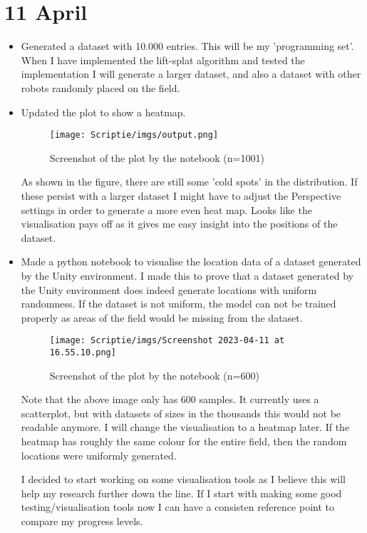 \documentclass[twoside]{report}
\begin{document}
\section*{11 April}
\begin{itemize}
\item Generated a dataset with 10.000 entries. This will be my 'programming set'. When I have implemented the lift-splat algorithm and tested the implementation I will generate a larger dataset, and also a dataset with other robots randomly placed on the field.
\item Updated the plot to show a heatmap.
        \begin{figure}[!h]
        \begin{centering}
        \texttt{[image: Scriptie/imgs/output.png]}
        \caption{Screenshot of the plot by the notebook (n=1001)}
        \end{centering}
        \end{figure}
        As shown in the figure, there are still some 'cold spots' in the distribution. If these persist with a larger dataset I might have to adjust the Perspective settings in order to generate a more even heat map. Looks like the visualisation pays off as it gives me easy insight into the positions of the dataset.
\item Made a python notebook to visualise the location data of a dataset generated by the Unity environment. I made this to prove that a dataset generated by the Unity environment does indeed generate locations with uniform randomness. If the dataset is not uniform, the model can not be trained properly as areas of the field would be missing from the dataset.
        \begin{figure}[!h]
        \begin{centering}
        \texttt{[image: Scriptie/imgs/Screenshot 2023-04-11 at 16.55.10.png]}
        \caption{Screenshot of the plot by the notebook (n=600)}
        \end{centering}
        \end{figure}
Note that the above image only has 600 samples. It currently uses a scatterplot, but with datasets of sizes in the thousands this would not be readable anymore. I will change the visualisation to a heatmap later. If the heatmap has roughly the same colour for the entire field, then the random locations were uniformly generated.  

I decided to start working on some visualisation tools as I believe this will help my research further down the line. If I start with making some good testing/visualisation tools now I can have a consisten reference point to compare my progress levels.
\end{itemize}
\end{document}
